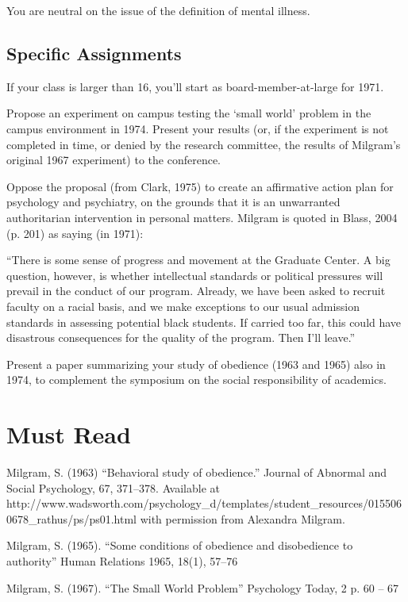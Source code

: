 \begin{refsection}
You are neutral on the issue of the definition of mental illness.

\subsection{Specific Assignments}
\label{specificassignments}

If your class is larger than 16, you'll start as board-member-at-large for 1971.

Propose an experiment on campus testing the `small world' problem in the campus environment in 1974. Present your results (or, if the experiment is not completed in time, or denied by the research committee, the results of Milgram's original 1967 experiment) to the conference.

Oppose the proposal (from Clark, 1975) to create an affirmative action plan for psychology and psychiatry, on the grounds that it is an unwarranted authoritarian intervention in personal matters. Milgram is quoted in Blass, 2004 (p. 201) as saying (in 1971):

``There is some sense of progress and movement at the Graduate Center. A big question, however, is whether intellectual standards or political pressures will prevail in the conduct of our program. Already, we have been asked to recruit faculty on a racial basis, and we make exceptions to our usual admission standards in assessing potential black students. If carried too far, this could have disastrous consequences for the quality of the program. Then I'll leave.''

Present a paper summarizing your study of obedience (1963 and 1965) also in 1974, to complement the symposium on the social responsibility of academics.

\section{Must Read}
\label{mustread}

Milgram, S. (1963) ``Behavioral study of obedience.'' Journal of Abnormal and Social Psychology, 67, 371–378. Available at http:\slash \slash www.wadsworth.com\slash psychology\_d\slash templates\slash student\_resources\slash 0155060678\_rathus\slash ps\slash ps01.html with permission from Alexandra Milgram.

Milgram, S. (1965). ``Some conditions of obedience and disobedience to authority'' Human Relations 1965, 18(1), 57--76

Milgram, S. (1967). ``The Small World Problem'' Psychology Today, 2 p. 60 – 67


\end{refsection}
